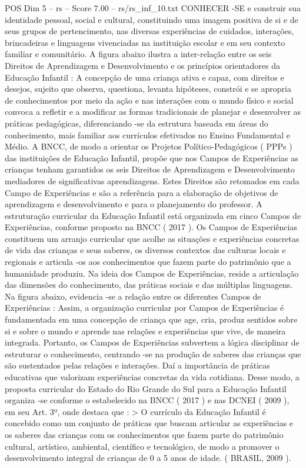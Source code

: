 \begin{textsample}{POS Dim 5 – rs – Score 7.00 – rs/rs\_inf\_10.txt}
CONHECER -SE e construir sua identidade pessoal, social e cultural, constituindo uma imagem positiva de si e de seus grupos de pertencimento, nas diversas experiências de cuidados, interações, brincadeiras e linguagens vivenciadas na instituição escolar e em seu contexto familiar e comunitário.
A figura abaixo ilustra a inter-relação entre os seis Direitos de Aprendizagem e Desenvolvimento e os princípios orientadores da Educação Infantil : A concepção de uma criança ativa e capaz, com direitos e desejos, sujeito que observa, questiona, levanta hipóteses, constrói e se apropria de conhecimentos por meio da ação e nas interações com o mundo físico e social convoca a refletir e a modificar as formas tradicionais de planejar e desenvolver as práticas pedagógicas, diferenciando -se da estrutura baseada em áreas do conhecimento, mais familiar aos currículos efetivados no Ensino Fundamental e Médio.
A BNCC, de modo a orientar os Projetos Político-Pedagógicos ( PPPs ) das instituições de Educação Infantil, propõe que nos Campos de Experiências as crianças tenham garantidos os seis Direitos de Aprendizagem e Desenvolvimento mediadores de significativas aprendizagens.
Estes Direitos são retomados em cada Campo de Experiências e são a referência para a elaboração de objetivos de aprendizagem e desenvolvimento e para o planejamento do professor.
A estruturação curricular da Educação Infantil está organizada em cinco Campos de Experiências, conforme proposto na BNCC ( 2017 ).
Os Campos de Experiências constituem um arranjo curricular que acolhe as situações e experiências concretas de vida das crianças e seus saberes, os diversos contextos das culturas locais e regionais e articula -os aos conhecimentos que fazem parte do patrimônio que a humanidade produziu.
Na ideia dos Campos de Experiências, reside a articulação das dimensões do conhecimento, das práticas sociais e das múltiplas linguagens.
Na figura abaixo, evidencia -se a relação entre os diferentes Campos de Experiências : Assim, a organização curricular por Campos de Experiências é fundamentada em uma concepção de criança que age, cria, produz sentidos sobre si e sobre o mundo e aprende nas relações e experiências que vive, de maneira integrada.
Portanto, os Campos de Experiências subvertem a lógica disciplinar de estruturar o conhecimento, centrando -se na produção de saberes das crianças que são sustentados pelas relações e interações.
Daí a importância de práticas educativas que valorizam experiências concretas da vida cotidiana.
Desse modo, a proposta curricular do Estado do Rio Grande do Sul para a Educação Infantil organiza -se conforme o estabelecido na BNCC ( 2017 ) e nas DCNEI ( 2009 ), em seu Art. 3º, onde destaca que : > O currículo da Educação Infantil é concebido como um conjunto de práticas que buscam articular as experiências e os saberes das crianças com os conhecimentos que fazem parte do patrimônio cultural, artístico, ambiental, científico e tecnológico, de modo a promover o desenvolvimento integral de crianças de 0 a 5 anos de idade. ( BRASIL, 2009 ).

\end{textsample}
